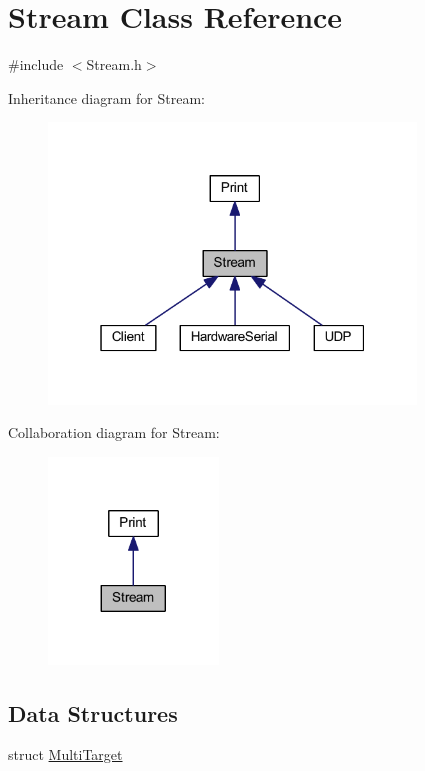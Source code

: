 \hypertarget{class_stream}{}\section{Stream Class Reference}
\label{class_stream}


{\ttfamily \#include $<$Stream.\+h$>$}



Inheritance diagram for Stream\+:
\nopagebreak
\begin{figure}[H]
\begin{center}
\leavevmode
\includegraphics[width=277pt]{class_stream__inherit__graph}
\end{center}
\end{figure}


Collaboration diagram for Stream\+:
\nopagebreak
\begin{figure}[H]
\begin{center}
\leavevmode
\includegraphics[width=128pt]{class_stream__coll__graph}
\end{center}
\end{figure}
\subsection*{Data Structures}
\begin{DoxyCompactItemize}
\item 
struct \hyperlink{struct_stream_1_1_multi_target}{Multi\+Target}
\end{DoxyCompactItemize}
